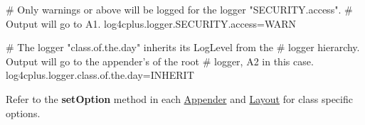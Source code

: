 \begin{DoxyPre}\# Only warnings or above will be logged for the logger "SECURITY.access".
\# Output will go to A1.
log4cplus.logger.SECURITY.access=WARN\end{DoxyPre}



\begin{DoxyPre}\# The logger "class.of.the.day" inherits its LogLevel from the
\# logger hierarchy.  Output will go to the appender's of the root
\# logger, A2 in this case.
log4cplus.logger.class.of.the.day=INHERIT
\end{DoxyPre}


Refer to the {\bfseries set\-Option} method in each \hyperlink{classlog4cplus_1_1Appender}{Appender} and \hyperlink{classlog4cplus_1_1Layout}{Layout} for class specific options.

